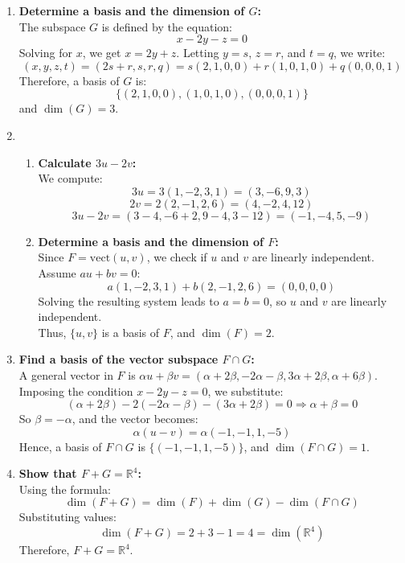 \documentclass[12pt]{article}
\begin{document}
\begin{answerbox}
\begin{enumerate}
    \item \textbf{Determine a basis and the dimension of $G$:} \\
    The subspace $G$ is defined by the equation:
    $$
    x - 2y - z = 0
    $$
    Solving for $x$, we get $x = 2y + z$. Letting $y = s$, $z = r$, and $t = q$, we write:
    $$
    (x, y, z, t) = (2s + r, s, r, q) = s(2, 1, 0, 0) + r(1, 0, 1, 0) + q(0, 0, 0, 1)
    $$
    Therefore, a basis of $G$ is:
    $$
    \{(2, 1, 0, 0), (1, 0, 1, 0), (0, 0, 0, 1)\}
    $$
    and $\dim(G) = 3$.

    \item \begin{enumerate}    

    \item\textbf{Calculate $3u - 2v$:} \\
    We compute:
    $$
    3u = 3(1, -2, 3, 1) = (3, -6, 9, 3)
    $$
    $$
    2v = 2(2, -1, 2, 6) = (4, -2, 4, 12)
    $$
    $$
    3u - 2v = (3 - 4, -6 + 2, 9 - 4, 3 - 12) = (-1, -4, 5, -9)
    $$

    \item \textbf{Determine a basis and the dimension of $F$:} \\
    Since $F = \text{vect}(u, v)$, we check if $u$ and $v$ are linearly independent. \\
    Assume $a u + b v = 0$:
    $$
    a(1, -2, 3, 1) + b(2, -1, 2, 6) = (0, 0, 0, 0)
    $$
    Solving the resulting system leads to $a = b = 0$, so $u$ and $v$ are linearly independent. \\
    Thus, $\{u, v\}$ is a basis of $F$, and $\dim(F) = 2$.

    \end{enumerate}  

    \item \textbf{Find a basis of the vector subspace $F \cap G$:} \\
    A general vector in $F$ is $\alpha u + \beta v = (\alpha + 2\beta, -2\alpha - \beta, 3\alpha + 2\beta, \alpha + 6\beta)$. \\
    Imposing the condition $x - 2y - z = 0$, we substitute:
    $$
    (\alpha + 2\beta) - 2(-2\alpha - \beta) - (3\alpha + 2\beta) = 0 \Rightarrow \alpha + \beta = 0
    $$
    So $\beta = -\alpha$, and the vector becomes:
    $$
    \alpha(u - v) = \alpha(-1, -1, 1, -5)
    $$
    Hence, a basis of $F \cap G$ is $\{(-1, -1, 1, -5)\}$, and $\dim(F \cap G) = 1$.

    \item \textbf{Show that $F + G = \mathbb{R}^4$:} \\
    Using the formula:
    $$
    \dim(F + G) = \dim(F) + \dim(G) - \dim(F \cap G)
    $$
    Substituting values:
    $$
    \dim(F + G) = 2 + 3 - 1 = 4 = \dim(\mathbb{R}^4)
    $$
    Therefore, $F + G = \mathbb{R}^4$.
\end{enumerate}
\end{answerbox}
\end{document}
